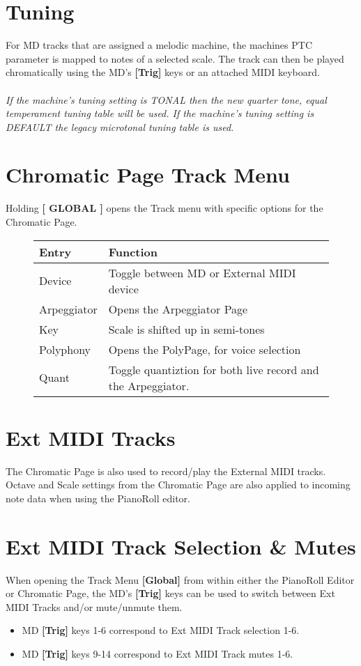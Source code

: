 \section{Tuning}
For MD tracks that are assigned a melodic machine, the machines PTC parameter is mapped to notes of a selected scale. The track can then be played chromatically using the MD's \textbf{[Trig]} keys or an attached MIDI keyboard.\\\\
\textit{If the machine's tuning setting is TONAL then the new quarter tone, equal temperament tuning table will be used. If the machine's tuning setting is DEFAULT the legacy microtonal tuning table is used.}
\newpage
\section{Chromatic Page Track Menu}
Holding \textbf{[ GLOBAL ]} opens the Track menu with specific options for the Chromatic Page.
\begin{figure}[hb]
    \begin{tabular}{|l|l|}
    \hline
    \rowcolor[HTML]{C0C0C0} 
    Entry            & Function \\ \hline
    Device           & Toggle between MD or External MIDI device\\ \hline
    Arpeggiator      & Opens the Arpeggiator Page \\ \hline
    Key              & Scale is shifted up in semi-tones\\ \hline
    Polyphony        & Opens the PolyPage, for voice selection\\ \hline
    Quant            & Toggle quantiztion for both live record and the Arpeggiator.\\ \hline
    \end{tabular}
\end{figure}
\section{Ext MIDI Tracks}
The Chromatic Page is also used to record/play the External MIDI tracks.
Octave and Scale settings from the Chromatic Page are also applied to incoming note data when using the PianoRoll editor.
\section{Ext MIDI Track Selection \& Mutes}
When opening the Track Menu \textbf{[Global]}  from within either the PianoRoll Editor or Chromatic Page, the MD's \textbf{[Trig]} keys can be used to switch between Ext MIDI Tracks and/or  mute/unmute them.
\begin{itemize}
    \item MD \textbf{[Trig]} keys 1-6 correspond to Ext MIDI Track selection 1-6.
    \item MD \textbf{[Trig]} keys 9-14 correspond to Ext MIDI Track mutes 1-6.
\end{itemize}
